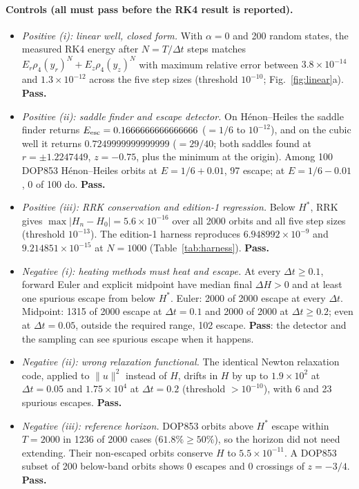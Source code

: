 \documentclass[11pt,a4paper]{article}
\theoremstyle{definition}
\newcommand{\Hs}{H^{*}}
\begin{document}
\paragraph{Controls (all must pass before the RK4 result is reported).}
\begin{itemize}
  \item \emph{Positive (i): linear well, closed form.} With $\alpha=0$ and 200 random states, the measured RK4 energy after $N=T/\Delta t$ steps matches $E_r\rho_4(y_r)^N+E_z\rho_4(y_z)^N$ with maximum relative error between $3.8\times10^{-14}$ and $1.3\times10^{-12}$ across the five step sizes (threshold $10^{-10}$; Fig.~\ref{fig:linear}a). \textbf{Pass.}
  \item \emph{Positive (ii): saddle finder and escape detector.} On H\'enon--Heiles the saddle finder returns $E_{\rm esc}=0.1666666666666666$ ($=1/6$ to $10^{-12}$), and on the cubic well it returns $0.7249999999999999$ ($=29/40$; both saddles found at $r=\pm1.2247449$, $z=-0.75$, plus the minimum at the origin). Among 100 DOP853 H\'enon--Heiles orbits at $E=1/6+0.01$, 97 escape; at $E=1/6-0.01$, 0 of 100 do. \textbf{Pass.}
  \item \emph{Positive (iii): RRK conservation and edition-1 regression.} Below $\Hs$, RRK gives $\max|H_n-H_0|=5.6\times10^{-16}$ over all 2000 orbits and all five step sizes (threshold $10^{-13}$). The edition-1 harness reproduces $6.948992\times10^{-9}$ and $9.214851\times10^{-15}$ at $N=1000$ (Table~\ref{tab:harness}). \textbf{Pass.}
  \item \emph{Negative (i): heating methods must heat and escape.} At every $\Delta t\ge0.1$, forward Euler and explicit midpoint have median final $\Delta H>0$ and at least one spurious escape from below $\Hs$. Euler: 2000 of 2000 escape at every $\Delta t$. Midpoint: 1315 of 2000 escape at $\Delta t=0.1$ and 2000 of 2000 at $\Delta t\ge0.2$; even at $\Delta t=0.05$, outside the required range, 102 escape. \textbf{Pass}: the detector and the sampling can see spurious escape when it happens.
  \item \emph{Negative (ii): wrong relaxation functional.} The identical Newton relaxation code, applied to $\|u\|^2$ instead of $H$, drifts in $H$ by up to $1.9\times10^{2}$ at $\Delta t=0.05$ and $1.75\times10^{4}$ at $\Delta t=0.2$ (threshold $>10^{-10}$), with 6 and 23 spurious escapes. \textbf{Pass.}
  \item \emph{Negative (iii): reference horizon.} DOP853 orbits above $\Hs$ escape within $T=2000$ in 1236 of 2000 cases ($61.8\%\ge50\%$), so the horizon did not need extending. Their non-escaped orbits conserve $H$ to $5.5\times10^{-11}$. A DOP853 subset of 200 below-band orbits shows 0 escapes and 0 crossings of $z=-3/4$. \textbf{Pass.}
\end{itemize}
\end{document}
